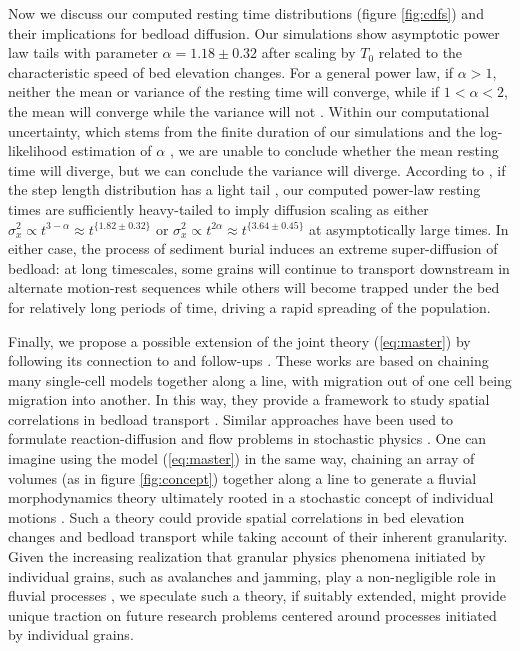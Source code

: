 \documentclass[draft]{agujournal2018}
\begin{document}
Now we discuss our computed resting time distributions (figure \ref{fig:cdfs}) and their implications for bedload diffusion.
Our simulations show asymptotic power law tails with parameter $\alpha = 1.18 \pm 0.32$ after scaling by $T_0$ related to the characteristic speed of bed elevation changes.
For a general power law, if $\alpha>1$, neither the mean or variance of the resting time will converge, while if $1<\alpha <2$, the mean will converge while the variance will not \citep[e.g.][]{Bradley2017}.
Within our computational uncertainty, which stems from the finite duration of our simulations and the log-likelihood estimation of $\alpha$ \citep[e.g.][]{Newman2005}, we are unable to conclude whether the mean resting time will diverge, but we can conclude the variance will diverge.
According to \citet{Weeks1998}, if the step length distribution has a light tail \citep[e.g.][]{Hassan2013}, our computed power-law resting times are sufficiently heavy-tailed to imply diffusion scaling as either $\sigma_x^2 \propto t^{3-\alpha} \approx t^{\{1.82 \pm 0.32 \}}$ or $\sigma_x^2 \propto t^{2\alpha} \approx t^{\{3.64\pm 0.45\}}$ at asymptotically large times.
In either case, the process of sediment burial induces an extreme super-diffusion of bedload: at long timescales, some grains will continue to transport downstream in alternate motion-rest sequences while others will become trapped under the bed for relatively long periods of time, driving a rapid spreading of the population.

Finally, we propose a possible extension of the joint theory (\ref{eq:master}) by following its connection to \citet{Ancey2008} and follow-ups \citep[e.g.][]{Ancey2014a, Heyman2014, Heyman2015}.
These works are based on chaining many \citet{Ancey2008} single-cell models together along a line, with migration out of one cell being migration into another.
In this way, they provide a framework to study spatial correlations in bedload transport \citep[e.g.][]{Heyman2014,Heyman2015}.
Similar approaches have been used to formulate reaction-diffusion and flow problems in stochastic physics \citep[e.g.][]{Gardiner1983}. 
One can imagine using the model (\ref{eq:master}) in the same way, chaining an array of volumes (as in figure \ref{fig:concept}) together along a line to generate a fluvial morphodynamics theory ultimately rooted in a stochastic concept of individual motions \citep[e.g.][]{Einstein1937}.
Such a theory could provide spatial correlations in bed elevation changes and bedload transport while taking account of their inherent granularity.
Given the increasing realization that granular physics phenomena initiated by individual grains, such as avalanches and jamming, play a non-negligible role in fluvial processes \citep[e.g.][]{Saletti2016,Dhont2018}, we speculate such a theory, if suitably extended, might provide unique traction on future research problems centered around processes initiated by individual grains.
\end{document}
